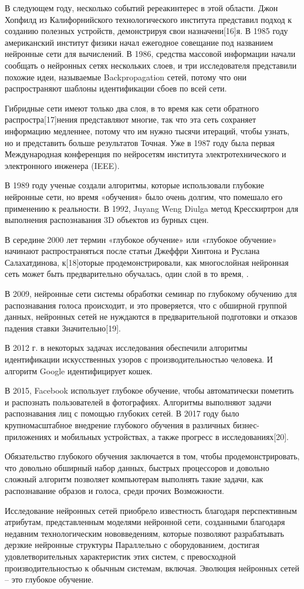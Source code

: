 В следующем году, несколько событий ререакинтерес в этой области. Джон Хопфилд из Калифорнийского технологического института представил подход к созданию полезных устройств, демонстрируя свои назначени[16]я. В 1985 году американский институт физики начал ежегодное совещание под названием нейронные сети для вычислений. В 1986, средства массовой информации начали сообщать о нейронных сетях нескольких слоев, и три исследователя представили похожие идеи, называемые Backpropagation сетей, потому что они распространяют шаблоны идентификации сбоев по всей сети.

Гибридные сети имеют только два слоя, в то время как сети обратного распростра[17]нения представляют многие, так что эта сеть сохраняет информацию медленнее, потому что им нужно тысячи итераций, чтобы узнать, но и представить больше результатов Точная. Уже в 1987 году была первая Международная конференция по нейросетям института электротехнического и электронного инженера (IEEE).

В 1989 году ученые создали алгоритмы, которые использовали глубокие нейронные сети, но время «обучения» было очень долгим, что помешало его применению к реальности. В 1992, Juyang Weng Diulga метод Кресскиртрон для выполнения распознавания 3D объектов из бурных сцен.

В середине 2000 лет термин «глубокое обучение» или «глубокое обучение» начинают распространяться после статьи Джеффри Хинтона и Руслана Салахатдинова, к[18]оторые продемонстрировали, как многослойная нейронная сеть может быть предварительно обучалась, один слой в то время, .

В 2009, нейронные сети системы обработки семинар по глубокому обучению для распознавания голоса происходит, и это проверяется, что с обширной группой данных, нейронных сетей не нуждаются в предварительной подготовки и отказов падения ставки Значительно[19].

В 2012 г. в некоторых задачах исследования обеспечили алгоритмы идентификации искусственных узоров с производительностью человека. И алгоритм Google идентифицирует кошек.

В 2015, Facebook использует глубокое обучение, чтобы автоматически пометить и распознать пользователей в фотографиях. Алгоритмы выполняют задачи распознавания лиц с помощью глубоких сетей. В 2017 году было крупномасштабное внедрение глубокого обучения в различных бизнес-приложениях и мобильных устройствах, а также прогресс в исследованиях[20].

Обязательство глубокого обучения заключается в том, чтобы продемонстрировать, что довольно обширный набор данных, быстрых процессоров и довольно сложный алгоритм позволяет компьютерам выполнять такие задачи, как распознавание образов и голоса, среди прочих Возможности.

Исследование нейронных сетей приобрело известность благодаря перспективным атрибутам, представленным моделями нейронной сети, созданными благодаря недавним технологическим нововведениям, которые позволяют разрабатывать дерзкие нейронные структуры Параллельно с оборудованием, достигая удовлетворительных характеристик этих систем, с превосходной производительностью к обычным системам, включая. Эволюция нейронных сетей – это глубокое обучение.